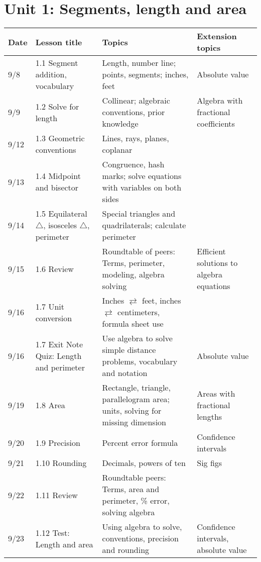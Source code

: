 

\geometry{hoffset=-0.5in, textwidth=7.5in}

\fancyhead[RE]{\thepage}
\fancyhead[RO]{\thepage }%



\section*{Unit 1: Segments, length and area}

\begin{tabular}{|p{0.9cm}|p{4cm}|p{7cm}|p{5cm}|}
  \hline
  Date & Lesson title & Topics  & Extension topics \\
  \hline
  9/8 & 1.1 Segment addition, vocabulary & Length, number line; points, segments; inches, feet & Absolute value \\
  \hline
  9/9 & 1.2 Solve for length & Collinear; algebraic conventions, prior knowledge & Algebra with fractional coefficients \\
  \hline
  9/12 & 1.3 Geometric conventions & Lines, rays, planes, coplanar &  \\
  \hline
  9/13 & 1.4 Midpoint and bisector & Congruence, hash marks; solve equations with variables on both sides &  \\
  \hline
  9/14 & 1.5 Equilateral $\triangle$, isosceles $\triangle$, perimeter & Special triangles and quadrilaterals; calculate perimeter &  \\
  \hline
  9/15 & 1.6 Review & Roundtable of peers: Terms, perimeter, modeling, algebra solving & Efficient solutions to algebra equations \\
  \hline
  9/16 & 1.7 Unit conversion & Inches $\rightleftarrows$ feet, inches $\rightleftarrows$ centimeters, formula sheet use &  \\
  \hline
  9/16 & 1.7 Exit Note Quiz: Length and perimeter & Use algebra to solve simple distance problems, vocabulary and notation & Absolute value \\
  \hline
  9/19 & 1.8 Area & Rectangle, triangle, parallelogram area; units, solving for missing dimension & Areas with fractional lengths \\
  \hline
  9/20 & 1.9 Precision & Percent error formula & Confidence intervals \\
  \hline
  9/21 & 1.10 Rounding & Decimals, powers of ten & Sig figs \\
  \hline
  9/22 & 1.11 Review & Roundtable peers: Terms, area and perimeter, \% error, solving algebra & \\
  \hline
  9/23 & 1.12 Test: Length and area & Using algebra to solve, conventions, precision and rounding & Confidence intervals, absolute value \\
  \hline

\end{tabular} \par \vspace*{0.3cm}
